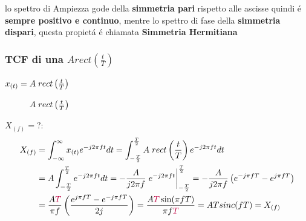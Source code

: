         lo spettro di Ampiezza gode della \textbf{simmetria pari} rispetto alle ascisse quindi é \textbf{sempre positivo e continuo}, mentre lo spettro di fase della \textbf{simmetria dispari}, 
        questa propietá é chiamata \textbf{Simmetria Hermitiana}

        \subsubsection{TCF di una $Arect\left(\frac{t}{T}\right)$}
            $x_{(t)} = A\hspace{0.1cm}rect\left(\frac{t}{T}\right)$
            \begin{figure}[H]
                \centering
                \caption{$A\hspace{0.1cm}rect\left(\frac{t}{T}\right)$}
                \label{fig:grafo rect nella tcf}
            \end{figure}
            $X_{(f)} = ? :$
            \begin{align}
                X_{(f)} & = \int_{-\infty}^{\infty} x_{(t)} e^{-j2\pi ft} dt \nonumber = \int_{-\frac{T}{2}}^{\frac{T}{2}} A\hspace{0.1cm}rect\left(\frac{t}{T}\right) e^{-j2\pi ft} dt \nonumber\\ 
                        & = A \int_{-\frac{T}{2}}^{\frac{T}{2}} e^{-j2\pi ft} dt = -\frac{A}{j2\pi f} \eval{e^{-j2\pi ft}}_{-\frac{T}{2}}^{\frac{T}{2}} =-\frac{A}{j2\pi f} \left(e^{-j\pi fT} - e^{j\pi fT}\right) \nonumber\\
                        & = \frac{A\color{purple}{T}}{\pi f} \left(\frac{e^{j\pi fT} - e^{-j\pi fT}}{2j}\right) = \frac{A{\color{purple}T}\sin(\pi fT)}{\pi f\color{purple}{T}} = AT sinc(fT) =  X_{(f)} \nonumber 
            \end{align}
